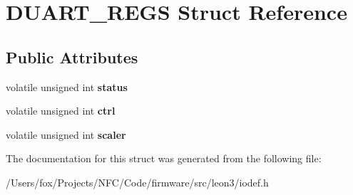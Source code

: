 \hypertarget{struct_d_u_a_r_t___r_e_g_s}{
\section{DUART\_\-REGS Struct Reference}
\label{struct_d_u_a_r_t___r_e_g_s}
}
\subsection*{Public Attributes}
\begin{DoxyCompactItemize}
\item 
\hypertarget{struct_d_u_a_r_t___r_e_g_s_aad2feefe3dfa3bec4195089368ff2f97}{
volatile unsigned int {\bfseries status}}
\label{struct_d_u_a_r_t___r_e_g_s_aad2feefe3dfa3bec4195089368ff2f97}

\item 
\hypertarget{struct_d_u_a_r_t___r_e_g_s_a7c90bf8bee3ed40743153cfd59633609}{
volatile unsigned int {\bfseries ctrl}}
\label{struct_d_u_a_r_t___r_e_g_s_a7c90bf8bee3ed40743153cfd59633609}

\item 
\hypertarget{struct_d_u_a_r_t___r_e_g_s_ad95c4016db74d1ac298bf9eb6a32c886}{
volatile unsigned int {\bfseries scaler}}
\label{struct_d_u_a_r_t___r_e_g_s_ad95c4016db74d1ac298bf9eb6a32c886}

\end{DoxyCompactItemize}


The documentation for this struct was generated from the following file:\begin{DoxyCompactItemize}
\item 
/Users/fox/Projects/NFC/Code/firmware/src/leon3/iodef.h\end{DoxyCompactItemize}
